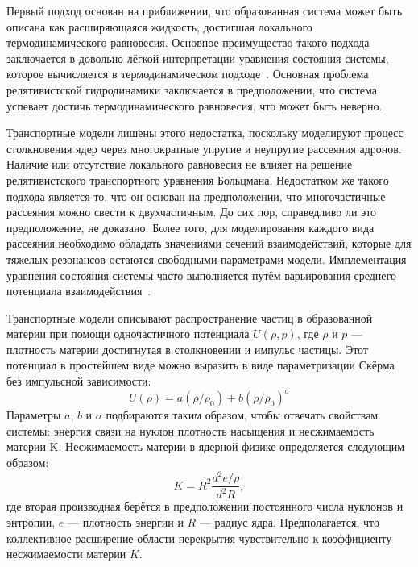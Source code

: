 Первый подход основан на приближении, что образованная система может быть описана как расширяющаяся жидкость, достигшая локального термодинамического равновесия. 
Основное преимущество такого подхода заключается в довольно лёгкой интерпретации уравнения состояния системы, которое вычисляется в термодинамическом подходе~\cite{Stoecker:1986ci}.
Основная проблема релятивистской гидродинамики заключается в предположении, что система успевает достичь термодинамического равновесия, что может быть неверно.

Транспортные модели лишены этого недостатка, поскольку моделируют процесс столкновения ядер через многократные упругие и неупругие рассеяния адронов.
Наличие или отсутствие локального равновесия не влияет на решение релятивистского транспортного уравнения Больцмана.
Недостатком же такого подхода является то, что он основан на предположении, что многочастичные рассеяния можно свести к двухчастичным.
До сих пор, справедливо ли это предположение, не доказано.
Более того, для моделирования каждого вида рассеяния необходимо обладать значениями сечений взаимодействий, которые для тяжелых резонансов остаются свободными параметрами модели.
Имплементация уравнения состояния системы часто выполняется путём варьирования среднего потенциала взаимодействия~\cite{Nara:2016hbg}.

Транспортные модели описывают распространение частиц в образованной материи при помощи одночастичного потенциала $U(\rho, p)$, где $\rho$ и $p$ --- плотность материи достигнутая в столкновении и импульс частицы.
Этот потенциал в простейшем виде можно выразить в виде параметризации Скёрма без импульсной зависимости:
\begin{equation}
    U(\rho) = a(\rho/\rho_0) + b(\rho/\rho_0)^\sigma
    \label{eq:skyrme}
\end{equation}
Параметры $a$, $b$ и $\sigma$ подбираются таким образом, чтобы отвечать свойствам системы: энергия связи на нуклон плотность насыщения и несжимаемость материи K.
Несжимаемость материи в ядерной физике определяется следующим образом:
\begin{equation}
    K = R^2 \frac{d^2 e/\rho}{ d^2 R },
\end{equation}
где вторая производная берётся в предположении постоянного числа нуклонов и энтропии, $e$ --- плотность энергии и $R$ --- радиус ядра.
Предполагается, что коллективное расширение области перекрытия чувствительно к коэффициенту несжимаемости материи $K$.

